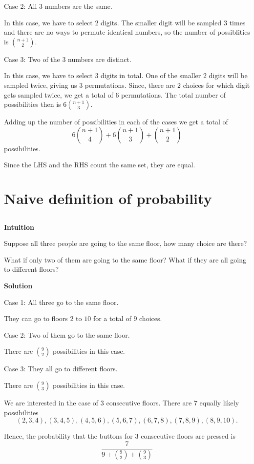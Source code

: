 \documentclass[]{book}
\begin{document}
Case 2: All \(3\) numbers are the same.

In this case, we have to select \(2\) digits. The smaller digit will be
sampled \(3\) times and there are no ways to permute identical numbers,
so the number of possiblities is \({n+1 \choose 2}\).

Case 3: Two of the \(3\) numbers are distinct.

In this case, we have to select \(3\) digits in total. One of the
smaller \(2\) digits will be sampled twice, giving us \(3\)
permutations. Since, there are \(2\) choices for which digit gets
sampled twice, we get a total of \(6\) permutations. The total number of
possibilities then is \(6{n+1 \choose 3}\).

Adding up the number of possibilities in each of the cases we get a
total of \[6{n+1 \choose 4} + 6{n+1 \choose 3} + {n+1 \choose 2}\]
possibilities.

Since the LHS and the RHS count the same set, they are equal.

\section{Naive definition of
probability}\label{naive-definition-of-probability}

\subsection{}\label{section-22}

\textbf{Intuition}

Suppose all three people are going to the same floor, how many choice
are there?

What if only two of them are going to the same floor? What if they are
all going to different floors?

 \textbf{Solution}

Case 1: All three go to the same floor.

They can go to floors \(2\) to \(10\) for a total of \(9\) choices.

Case 2: Two of them go to the same floor.

There are \(9 \choose 2\) possibilities in this case.

Case 3: They all go to different floors.

There are \(9 \choose 3\) possibilities in this case.

We are interested in the case of \(3\) consecutive floors. There are
\(7\) equally likely possibilities
\[(2, 3, 4), (3, 4, 5), (4, 5, 6), (5, 6, 7), (6, 7, 8), (7, 8, 9), (8, 9, 10).\]

Hence, the probability that the buttons for \(3\) consecutive floors are
pressed is \[\frac{7}{9 + {9 \choose 2} + {9 \choose 3}}\]


\end{document}
